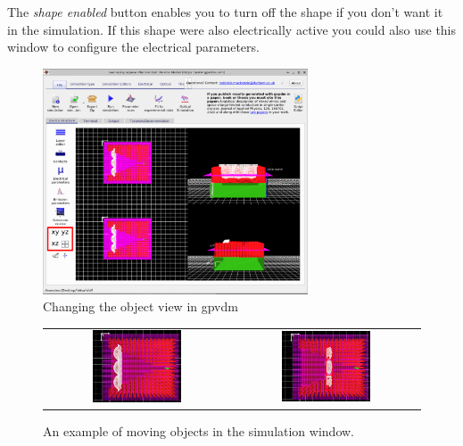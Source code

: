 The \emph{shape enabled} button enables you to turn off the shape if you don't want it in the simulation. If this shape were also electrically active you could also use this window to configure the electrical parameters.

 
\begin{figure}[H]
\centering
\includegraphics[width=0.7\textwidth]{./images/fdtd_7.png}
\caption{Changing the object view in gpvdm}
\label{fig:fdtdmainwindow}
\end{figure}

\begin{figure}[H]
\centering
\begin{tabular}{ c c }

\includegraphics[width=0.5\textwidth,height=0.4\textwidth]{./images/fdtd_5.png}

&
\includegraphics[width=0.5\textwidth,height=0.4\textwidth]{./images/fdtd_6.png}

\\

\end{tabular}
\caption{An example of moving objects in the simulation window.}
\label{fig:fdtdmovingobjects}
\end{figure}




